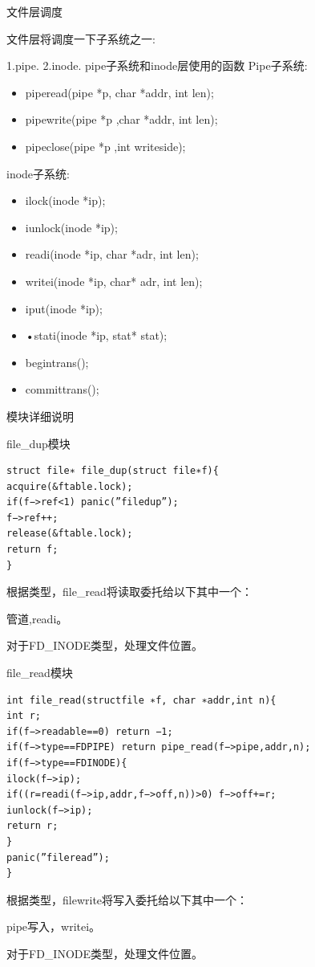 文件层调度

文件层将调度一下子系统之一:

1.pipe.
2.inode.
pipe子系统和inode层使用的函数
Pipe子系统:
\begin{itemize}
\item piperead(pipe *p, char *addr, int len);
\item pipewrite(pipe *p ,char *addr, int len);
\item pipeclose(pipe *p ,int writeside);
\end{itemize}

inode子系统:
\begin{itemize}
\item ilock(inode *ip);
\item iunlock(inode *ip);
\item readi(inode *ip, char *adr, int len);
\item writei(inode *ip, char* adr, int len);
\item iput(inode *ip);
\item •stati(inode *ip, stat* stat);
\item begintrans();
\item committrans();
\end{itemize}


模块详细说明

file\_dup模块

\begin{verbatim}
struct file∗ file_dup(struct file∗f){
acquire(&ftable.lock);
if(f−>ref<1) panic(”filedup”);
f−>ref++;
release(&ftable.lock);
return f;
}
\end{verbatim}

根据类型，file\_read将读取委托给以下其中一个：

管道,readi。

对于FD\_INODE类型，处理文件位置。

file\_read模块

\begin{verbatim}
int file_read(structfile ∗f, char ∗addr,int n){
int r;
if(f−>readable==0) return −1;
if(f−>type==FDPIPE) return pipe_read(f−>pipe,addr,n);
if(f−>type==FDINODE){
ilock(f−>ip);
if((r=readi(f−>ip,addr,f−>off,n))>0) f−>off+=r;
iunlock(f−>ip);
return r;
}
panic(”fileread”);
}
\end{verbatim}

根据类型，filewrite将写入委托给以下其中一个：

pipe写入，writei。

对于FD\_INODE类型，处理文件位置。

